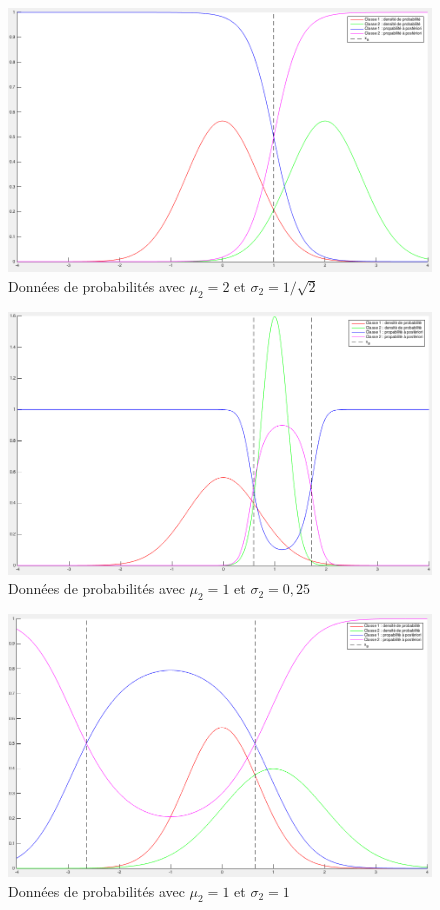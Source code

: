 \documentclass[11pt,a4paper]{article}
\begin{document}
\begin{figure}[H]
\center
\includegraphics[width=14cm]{exo1_graph_mu2.png}
\caption{Données de probabilités avec $\mu_2 = 2$ et $\sigma_2 = 1/\sqrt{2}$}
\end{figure}

\begin{figure}[H]
\center
\includegraphics[width=14cm]{exo1_graph_mu1_sigma025.png}
\caption{Données de probabilités avec $\mu_2 = 1$ et $\sigma_2 = 0,25$}
\end{figure}

\begin{figure}[H]
\center
\includegraphics[width=14cm]{exo1_graph_mu1_sigma1.png}
\caption{Données de probabilités avec $\mu_2 = 1$ et $\sigma_2 = 1$}
\end{figure}
\end{document}
